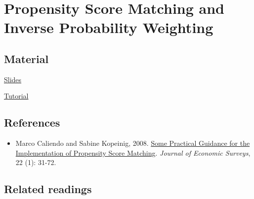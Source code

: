 \documentclass[a4paper,french,11pt]{article}
\begin{document}
\section{Propensity Score Matching and Inverse Probability Weighting}

\subsection*{Material}

\href{https://drive.google.com/file/d/1K7rZGZbwHmji-Seg5CF4z6tsvB6IUDw5/view?usp=share_link}{Slides}

\href{https://drive.google.com/file/d/19jxtcuSbF6FkDqyji7Aqlm1wlfCjXcpj/view?usp=share_link}{Tutorial} 
\subsection*{References}
\begin{itemize}

\item Marco Caliendo and Sabine Kopeinig, 2008. \href{http://ftp.iza.org/dp1588.pdf}{Some Practical Guidance for the Implementation of Propensity Score Matching}. \textit{Journal of Economic Surveys}, 22 (1): 31-72.
 \end{itemize}
 


\subsection*{Related readings}
\end{document}
